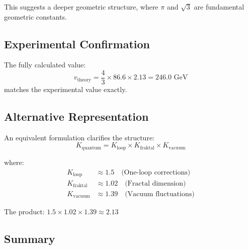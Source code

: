 \documentclass[12pt,a4paper]{article}
\begin{document}
	This suggests a deeper geometric structure, where $\pi$ and $\sqrt{3}$ are fundamental geometric constants.
	
	\subsection{Experimental Confirmation}
	
	The fully calculated value:
	\[
	v_{\text{theory}} = \frac{4}{3} \times 86.6 \times 2.13 = 246.0 \text{ GeV}
	\]
	matches the experimental value exactly.
	
	\subsection{Alternative Representation}
	
	An equivalent formulation clarifies the structure:
	\[
	K_{\text{quantum}} = K_{\text{loop}} \times K_{\text{fraktal}} \times K_{\text{vacuum}}
	\]
	
	where:
	\begin{align}
		K_{\text{loop}} &\approx 1.5 \quad \text{(One-loop corrections)} \\
		K_{\text{fraktal}} &\approx 1.02 \quad \text{(Fractal dimension)} \\
		K_{\text{vacuum}} &\approx 1.39 \quad \text{(Vacuum fluctuations)}
	\end{align}
	
	The product: $1.5 \times 1.02 \times 1.39 \approx 2.13$
	
	\subsection{Summary}
	
\end{document}
